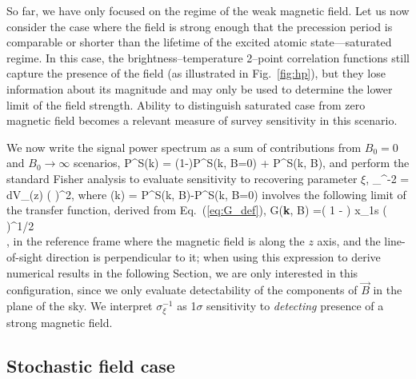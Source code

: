 So far, we have only focused on the regime of the weak magnetic field. Let us now consider the case where the field is strong enough that the precession period is comparable or shorter than the lifetime of the excited atomic state---saturated regime. In this case, the brightness--temperature 2--point correlation functions still capture the presence of the field (as illustrated in Fig.~\ref{fig:hp}), but they lose information about its magnitude and may only be used to determine the lower limit of the field strength. Ability to distinguish saturated case from zero magnetic field becomes a relevant measure of survey sensitivity in this scenario. 

We now write the signal power spectrum as a sum of contributions from $B_0=0$ and $B_0\to\infty$ scenarios, 
\beq
P^S(\vec k) = (1-\xi)P^S(\vec k, B=0) + \xi P^S(\vec k, B\to \infty),
\label{eq:saturated_P}
\eeq
and perform the standard Fisher analysis to evaluate sensitivity to recovering parameter $\xi$,
\beq
\bga
\sigma_{\xi}^{-2} = 
\int dV_\mathrm{}(z)
\left(  \right)^2,
\ega
\label{eq:sigma_xi}
\eeq
where
\beq
{}(\vec k) = P^S(\vec k, B\to \infty)-P^S(\vec k, B=0)
\eeq
involves the following limit of the transfer function, derived from Eq.~(\ref{eq:G_def}),
\beq
\bga
G({\bf{\widehat k}}, B\to \infty)
=\left( 1 -  \right) x_{1{\rm s}} \left(  \right)^{1/2} \\
\times {} ,
\label{eq:G_Binf}
\ega
\eeq
in the reference frame where the magnetic field is along the $z$ axis, and the line-of-sight direction is perpendicular to it; when using this expression to derive numerical results in the following Section, we are only interested in this configuration, since we only evaluate detectability of the components of $\vec B$ in the plane of the sky. We interpret $\sigma_\xi^{-1}$ as 1$\sigma$ sensitivity to \textit{detecting} presence of a strong magnetic field. 

\subsection{Stochastic field case}
\label{subsec:SI_fisher}

